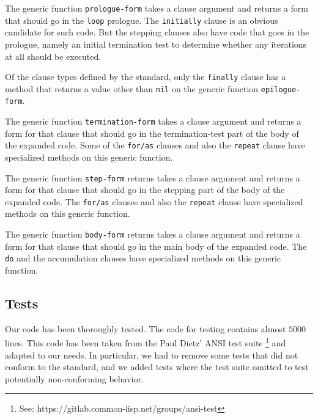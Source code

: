 The generic function \texttt{prologue-form} takes a clause argument
and returns a form that should go in the \texttt{loop} prologue.  The
\texttt{initially} clause is an obvious candidate for such code.  But
the stepping clauses also have code that goes in the prologue, namely
an initial termination test to determine whether any iterations at all
should be executed.

Of the clause types defined by the \commonlisp{} standard, only the
\texttt{finally} clause has a method that returns a value other than
\texttt{nil} on the generic function \texttt{epilogue-form}.

The generic function \texttt{termination-form} takes a clause argument
and returns a form for that clause that should go in the
termination-test part of the body of the expanded code.  Some of the
\texttt{for/as} clauses and also the \texttt{repeat} clause have
specialized methods on this generic function.

The generic function \texttt{step-form} returns takes a clause
argument and returns a form for that clause that should go in the
stepping part of the body of the expanded code.  The \texttt{for/as}
clauses and also the \texttt{repeat} clause have specialized methods
on this generic function.

The generic function \texttt{body-form} returns takes a clause
argument and returns a form for that clause that should go in the main
body of the expanded code.  The \texttt{do} and the accumulation
clauses have specialized methods on this generic function.

\subsection{Tests}
\label{sec-our-technique-tests}

Our code has been thoroughly tested.  The code for testing contains
almost $5000$ lines.  This code has been taken from the Paul Dietz'
ANSI test suite%
\footnote{See: https://gitlab.common-lisp.net/groups/ansi-test}
and adapted to our needs.  In particular, we had to remove some tests
that did not conform to the standard, and we added tests where the
test suite omitted to test potentially non-conforming behavior.
